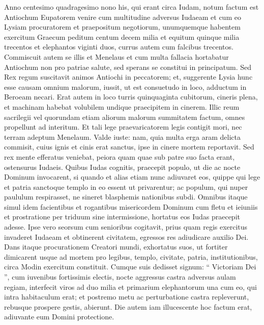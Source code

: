 \begin{biblechapter}
\begin{biblechapter}
\begin{biblechapter}
\begin{biblechapter}
\begin{biblechapter}
\begin{biblechapter}
\begin{biblechapter}
\begin{biblechapter}
\begin{biblechapter}
\begin{biblechapter}
\begin{biblechapter}
\begin{biblechapter}
\begin{biblechapter}
\verse Anno centesimo quadragesimo nono his, qui erant circa Iudam, notum factum est Antiochum Eupatorem venire cum multitudine adversus Iudaeam 
\verse et cum eo Lysiam procuratorem et praepositum negotiorum, unumquemque habentem exercitum Graecum peditum centum decem milia et equitum quinque milia trecentos et elephantos viginti duos, currus autem cum falcibus trecentos. 
\verse Commiscuit autem se illis et Menelaus et cum multa fallacia hortabatur Antiochum non pro patriae salute, sed sperans se constitui in principatum. 
\verse Sed Rex regum suscitavit animos Antiochi in peccatorem; et, suggerente Lysia hunc esse causam omnium malorum, iussit, ut est consuetudo in loco, adductum in Beroeam necari. 
\verse Erat autem in loco turris quinquaginta cubitorum, cineris plena, et machinam habebat volubilem undique praecipitem in cinerem. 
\verse Illic reum sacrilegii vel quorundam etiam aliorum malorum summitatem factum, omnes propellunt ad interitum. 
\verse Et tali lege praevaricatorem legis contigit mori, nec terram adeptum Menelaum. 
\verse Valde iuste: nam, quia multa erga aram delicta commisit, cuius ignis et cinis erat sanctus, ipse in cinere mortem reportavit.
 \verse Sed rex mente efferatus veniebat, peiora quam quae sub patre suo facta erant, ostensurus Iudaeis. 
\verse Quibus Iudas cognitis, praecepit populo, ut die ac nocte Dominum invocarent, si quando et alias etiam nunc adiuvaret eos, 
\verse quippe qui lege et patria sanctoque templo in eo essent ut privarentur; ac populum, qui nuper paululum respirasset, ne sineret blasphemis nationibus subdi. 
 \verse Omnibus itaque simul idem facientibus et rogantibus misericordem Dominum cum fletu et ieiuniis et prostratione per triduum sine intermissione, hortatus eos Iudas praecepit adesse. 
\verse Ipse vero seorsum cum senioribus cogitavit, prius quam regis exercitus invaderet Iudaeam et obtinerent civitatem, egressos res adiudicare auxilio Dei. 
\verse Dans itaque procurationem Creatori mundi, exhortatus suos, ut fortiter dimicarent usque ad mortem pro legibus, templo, civitate, patria, institutionibus, circa Modin exercitum constituit. 
\verse Cumque suis dedisset signum: “ Victoriam Dei ”, cum iuvenibus fortissimis electis, nocte aggressus castra adversus aulam regiam, interfecit viros ad duo milia et primarium elephantorum una cum eo, qui intra habitaculum erat; 
\verse et postremo metu ac perturbatione castra repleverunt, rebusque prospere gestis, abierunt. 
\verse Die autem iam illucescente hoc factum erat, adiuvante eum Domini protectione.

\end{biblechapter}
\end{biblechapter}
\end{biblechapter}
\end{biblechapter}
\end{biblechapter}
\end{biblechapter}
\end{biblechapter}
\end{biblechapter}
\end{biblechapter}
\end{biblechapter}
\end{biblechapter}
\end{biblechapter}
\end{biblechapter}
